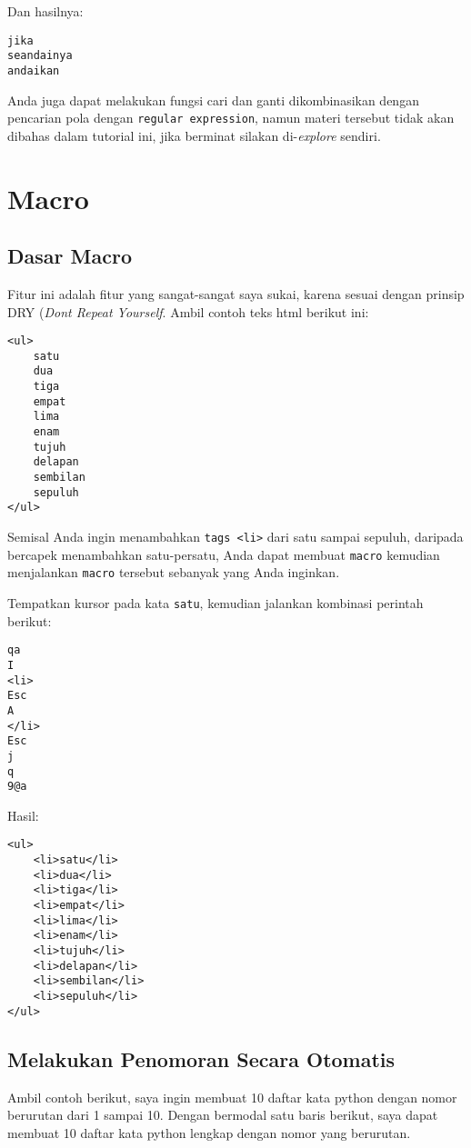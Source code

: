 \documentclass{article}
\begin{document}
Dan hasilnya:

\begin{verbatim}
jika
seandainya
andaikan
\end{verbatim}

Anda juga dapat melakukan fungsi cari dan ganti
dikombinasikan dengan pencarian pola dengan 
\verb=regular expression=, namun materi tersebut tidak akan
dibahas dalam tutorial ini, jika berminat silakan
di-\emph{explore} sendiri.

\section{Macro}

\subsection{Dasar Macro}
Fitur ini adalah fitur yang sangat-sangat saya sukai, karena
sesuai dengan prinsip DRY (\emph{Dont Repeat Yourself}.
Ambil contoh teks html berikut ini:

\begin{verbatim}
<ul>
    satu
    dua
    tiga
    empat
    lima
    enam
    tujuh
    delapan
    sembilan
    sepuluh
</ul>
\end{verbatim}

Semisal Anda ingin menambahkan \verb=tags <li>= dari satu
sampai sepuluh, daripada bercapek menambahkan satu-persatu,
Anda dapat membuat \verb=macro= kemudian menjalankan
\verb=macro= tersebut sebanyak yang Anda inginkan.

Tempatkan kursor pada kata \verb=satu=, kemudian jalankan
kombinasi perintah berikut:

\begin{verbatim}
qa
I
<li>
Esc
A
</li>
Esc
j
q
9@a
\end{verbatim}

Hasil:

\begin{verbatim}
<ul>
    <li>satu</li>
    <li>dua</li>
    <li>tiga</li>
    <li>empat</li>
    <li>lima</li>
    <li>enam</li>
    <li>tujuh</li>
    <li>delapan</li>
    <li>sembilan</li>
    <li>sepuluh</li>
</ul>
\end{verbatim}

\subsection{Melakukan Penomoran Secara Otomatis}

Ambil contoh berikut, saya ingin membuat 10 daftar kata
python dengan nomor berurutan dari 1 sampai 10. Dengan
bermodal satu baris berikut, saya dapat membuat 10 daftar
kata python lengkap dengan nomor yang berurutan.
\end{document}
